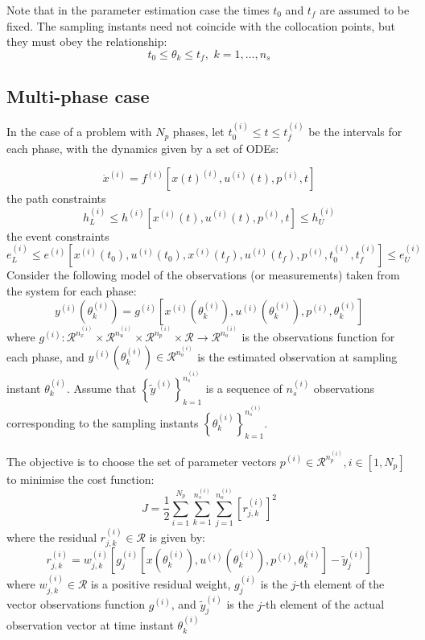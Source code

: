 \documentclass[a4paper,11pt]{report}    %
\newcommand{\RE}{\mathcal{R}}
\begin{document}
Note that in the parameter estimation case  the times $t_0$ and $t_f$ are assumed to be fixed. The sampling instants need not coincide 
with the collocation points, but they must obey the relationship:
\[
  t_0 \le \theta_k \le t_f, \,\, k=1,\ldots,n_s
\]




\subsection{Multi-phase case}

In the case of a problem with $N_p$ phases, let $t_0^{(i)} \le t \le t_f^{(i)}$ be the intervals for each phase, 
with the dynamics given by a set of ODEs:

\[
   \dot x^{(i)} = f^{(i)} [ x(t)^{(i)} , u^{(i)} (t), p^{(i)} , t ]
\]
the path constraints
\[
  h_L^{(i)}  \le h^{(i)} [ x^{(i)} (t), u^{(i)} (t), p^{(i)} , t ] \le h_U^{(i)} 
\]
the event constraints
\[
   e_L^{(i)}  \le e^{(i)} [ x^{(i)} (t_0), u^{(i)} (t_0), x^{(i)} (t_f), u^{(i)} (t_f), p^{(i)} , t_0^{(i)} , t_f^{(i)}  ] \le e_U^{(i)} 
\]
Consider the following model of the observations (or measurements) taken from the system for each phase:
\[
  y^{(i)} (\theta_{k}^{(i)}) = g^{(i)} [ x^{(i)} (\theta_{k}^{(i)}), u^{(i)} (\theta_{k}^{(i)}), p^{(i)} , \theta_{k}^{(i)} ]
\]
where $g^{(i)} :\RE^{n_x^{(i)} } \times \RE^{n_u^{(i)} } \times \RE^{n_p^{(i)} } \times \RE \rightarrow \RE^{n_o^{(i)} }$ is the observations function for each phase, and $y^{(i)} (\theta_{k}^{(i)}) \in \RE^{n_o^{(i)}}$ is
the estimated observation at sampling instant $\theta_{k}^{(i)}$.
Assume that  $\left\{ \tilde{y}^{(i)}  \right\}_{k=1}^{n_s^{(i)} }$ is a sequence of $n_s^{(i)} $  observations corresponding to the sampling instants 
$\left\{ \theta_{k}^{(i)} \right\}_{k=1}^{n_s^{(i)} }$. 

The objective is to choose the set of parameter vectors $p^{(i)}  \in \RE^{n_p^{(i)} }, i \in [1,N_p]$ to 
minimise the cost function:
\[
 J = \frac{1}{2} \sum \limits_{i=1}^{N_p} \sum\limits_{k=1}^{n_s^{(i)}}  \sum\limits_{j=1}^{n_o^{(i)}}   \left[ r_{j,k}^{(i)}  \right]^2
\]
where the residual $r_{j,k}^{(i)} \in \RE$ is given by:
\[
   r_{j,k}^{(i)} = w_{j,k}^{(i)} [g_j^{(i)}[x(\theta_{k}^{(i)}), u^{(i)}(\theta_k^{(i)}), p^{(i)}, \theta_{k}^{(i)}] - \tilde{y}^{(i)}_j]
\]
where $w_{j,k}^{(i)} \in \RE$ is 
a positive residual weight, $g_{j}^{(i)}$ is the $j$-th element of the vector observations function $g^{(i)}$, 
and $\tilde{y}^{(i)}_j$ is the $j$-th element of the actual observation vector at time instant $\theta_k^{(i)}$
\end{document}

